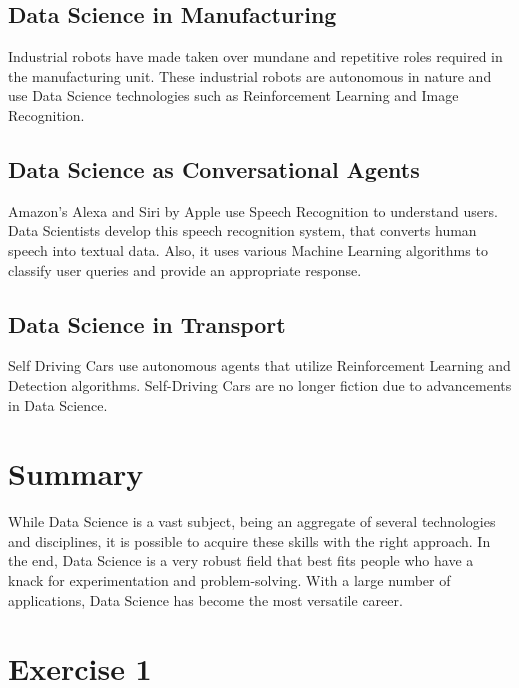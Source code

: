 \documentclass[
]{book}
\begin{document}
\hypertarget{data-science-in-manufacturing}{%
\subsection*{Data Science in Manufacturing}\label{data-science-in-manufacturing}}


Industrial robots have made taken over mundane and repetitive roles required in the manufacturing unit. These industrial robots are autonomous in nature and use Data Science technologies such as Reinforcement Learning and Image Recognition.

\hypertarget{data-science-as-conversational-agents}{%
\subsection*{Data Science as Conversational Agents}\label{data-science-as-conversational-agents}}


Amazon's Alexa and Siri by Apple use Speech Recognition to understand users. Data Scientists develop this speech recognition system, that converts human speech into textual data. Also, it uses various Machine Learning algorithms to classify user queries and provide an appropriate response.

\hypertarget{data-science-in-transport}{%
\subsection*{Data Science in Transport}\label{data-science-in-transport}}


Self Driving Cars use autonomous agents that utilize Reinforcement Learning and Detection algorithms. Self-Driving Cars are no longer fiction due to advancements in Data Science.

\hypertarget{summary}{%
\section*{Summary}\label{summary}}


While Data Science is a vast subject, being an aggregate of several technologies and disciplines, it is possible to acquire these skills with the right approach. In the end, Data Science is a very robust field that best fits people who have a knack for experimentation and problem-solving. With a large number of applications, Data Science has become the most versatile career.

\hypertarget{exercise-1}{%
\section*{Exercise 1}\label{exercise-1}}
\end{document}
